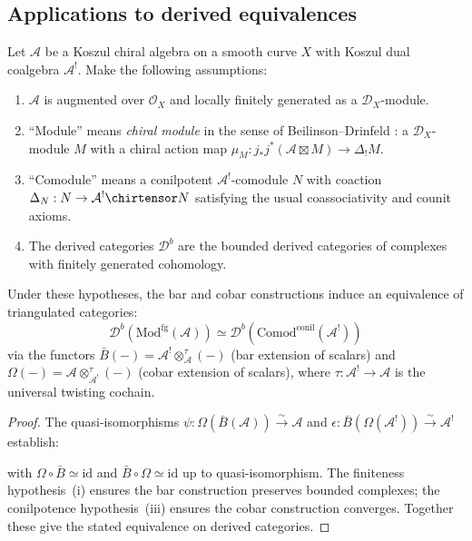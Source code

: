 \subsection{Applications to derived equivalences}

\begin{corollary}\label{cor:derived-equivalence-bar-cobar}
\label{cor:derived-equivalence-koszul}
Let $\mathcal{A}$ be a Koszul chiral algebra on a smooth curve $X$ with Koszul dual
coalgebra $\mathcal{A}^!$.  Make the following assumptions:
\begin{enumerate}[label=(\roman*)]
\item $\mathcal{A}$ is augmented over $\mathcal{O}_X$ and locally finitely generated
as a $\mathcal{D}_X$-module.
\item ``Module'' means \emph{chiral module} in the sense of Beilinson--Drinfeld
\cite{BD04}: a $\mathcal{D}_X$-module $M$ with a chiral action map
$\mu_M: j_*j^*(\mathcal{A} \boxtimes M) \to \Delta_! M$.
\item ``Comodule'' means a conilpotent $\mathcal{A}^!$-comodule
$N$ with coaction $\Delta_N: N \to \mathcal{A}^! \chirtensor N$ satisfying
the usual coassociativity and counit axioms.
\item The derived categories $\mathcal{D}^b$ are the bounded derived categories
of complexes with finitely generated cohomology.
\end{enumerate}
Under these hypotheses, the bar and cobar constructions induce an equivalence
of triangulated categories:
\[\mathcal{D}^b(\text{Mod}^{\mathrm{fg}}(\mathcal{A})) \simeq
\mathcal{D}^b(\text{Comod}^{\mathrm{conil}}(\mathcal{A}^!))\]
via the functors $\bar{B}(-) = \mathcal{A}^! \otimes^{\tau}_{\mathcal{A}} (-)$
(bar extension of scalars) and $\Omega(-) = \mathcal{A} \otimes^{\tau}_{\mathcal{A}^!} (-)$
(cobar extension of scalars), where $\tau: \mathcal{A}^! \to \mathcal{A}$ is the
universal twisting cochain.
\end{corollary}

\begin{proof}
The quasi-isomorphisms $\psi: \Omega(\bar{B}(\mathcal{A})) \xrightarrow{\sim} \mathcal{A}$
and $\epsilon: \bar{B}(\Omega(\mathcal{A}^!)) \xrightarrow{\sim} \mathcal{A}^!$
establish:

\begin{center}
\end{center}

with $\Omega \circ \bar{B} \simeq \text{id}$ and $\bar{B} \circ \Omega \simeq \text{id}$
up to quasi-isomorphism.  The finiteness hypothesis~(i) ensures the bar construction
preserves bounded complexes; the conilpotence hypothesis~(iii) ensures the cobar
construction converges.  Together these give the stated equivalence on derived categories.
\end{proof}

